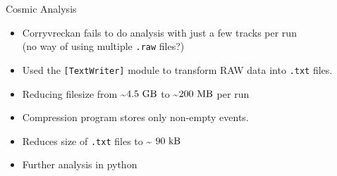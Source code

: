 \documentclass{beamer}
\begin{document}
\begin{frame}[fragile]{Cosmic Analysis}
    \footnotesize
    \begin{itemize}
	\item Corryvreckan fails to do analysis with just a few tracks per run \\
	    \tiny (no way of using multiple \verb`.raw` files?) \footnotesize
	\item Used the \verb`[TextWriter]` module to transform RAW data into
	    \verb`.txt` files.
	\item Reducing filesize from \textasciitilde \( 4.5 \ \si{\giga \byte} \)
	    to \textasciitilde \( 200 \ \si{\mega \byte} \) per run
	\pause
	\item Compression program stores only non-empty events.
	\item Reduces size of \verb`.txt` files to \textasciitilde
	    \( 90 \ \si{\kilo \byte} \) 
	\item Further analysis in python
    \end{itemize}
\end{frame}
\end{document}
